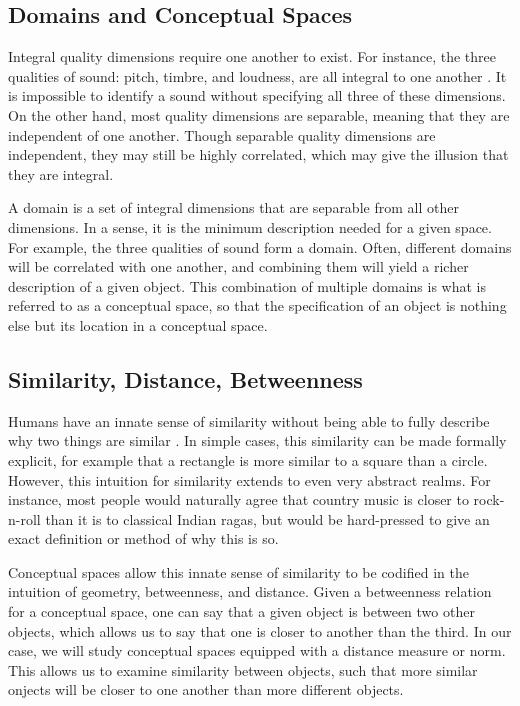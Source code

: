 \subsection{Domains and Conceptual Spaces}
\label{section:domains-and-conceptual-spaces}

Integral quality dimensions require one another to exist.  For instance, the three qualities of sound: pitch, timbre, and loudness, are all integral to one another \citep{mcadams1985qualities}.  It is impossible to identify a sound without specifying all three of these dimensions.  On the other hand, most quality dimensions are separable, meaning that they are independent of one another.  Though separable quality dimensions are independent, they may still be highly correlated, which may give the illusion that they are integral.

A domain is a set of integral dimensions that are separable from all other dimensions.  In a sense, it is the minimum description needed for a given space.  For example, the three qualities of sound form a domain.  Often, different domains will be correlated with one another, and combining them will yield a richer description of a given object.  This combination of multiple domains is what is referred to as a conceptual space, so that the specification of an object is nothing else but its location in a conceptual space.

\subsection{Similarity, Distance, Betweenness}
\label{section:similarity-distance-betweenness}

Humans have an innate sense of similarity without being able to fully describe why two things are similar \citep{tversky1977features}.  In simple cases, this similarity can be made formally explicit, for example that a rectangle is more similar to a square than a circle.  However, this intuition for similarity extends to even very abstract realms.  For instance, most people would naturally agree that country music is closer to rock-n-roll than it is to classical Indian ragas, but would be hard-pressed to give an exact definition or method of why this is so.

Conceptual spaces allow this innate sense of similarity to be codified in the intuition of geometry, betweenness, and distance.  Given a betweenness relation for a conceptual space, one can say that a given object is between two other objects, which allows us to say that one is closer to another than the third.  In our case, we will study conceptual spaces equipped with a distance measure or norm.  This allows us to examine similarity between objects, such that more similar onjects will be closer to one another than more different objects.


